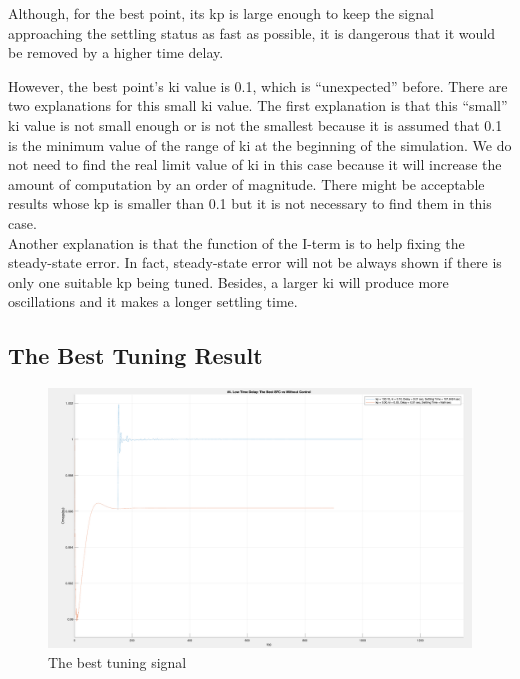 Although, for the best point, its kp is large enough to keep the signal approaching the settling status as fast as possible, it is dangerous that it would be removed by a higher time delay. 

However, the best point's ki value is 0.1, which is “unexpected” before. There are two explanations for this small ki value. The first explanation is that this “small” ki value is not small enough or is not the smallest because it is assumed that 0.1 is the minimum value of the range of ki at the beginning of the simulation. We do not need to find the real limit value of ki in this case because it will increase the amount of computation by an order of magnitude. There might be acceptable results whose kp is smaller than 0.1 but it is not necessary to find them in this case. \\

Another explanation is that the function of the I-term is to help fixing the steady-state error. In fact, steady-state error will not be always shown if there is only one suitable kp being tuned. Besides, a larger ki will produce more oscillations and it makes a longer settling time.  \\


\subsection{The Best Tuning Result} %

\begin{figure}[htbp]
\centering
\includegraphics[width = .819\textwidth]{figure/4_4_2_best.png}
\caption{The best tuning signal}
\label{4_4_2_best}
\end{figure}